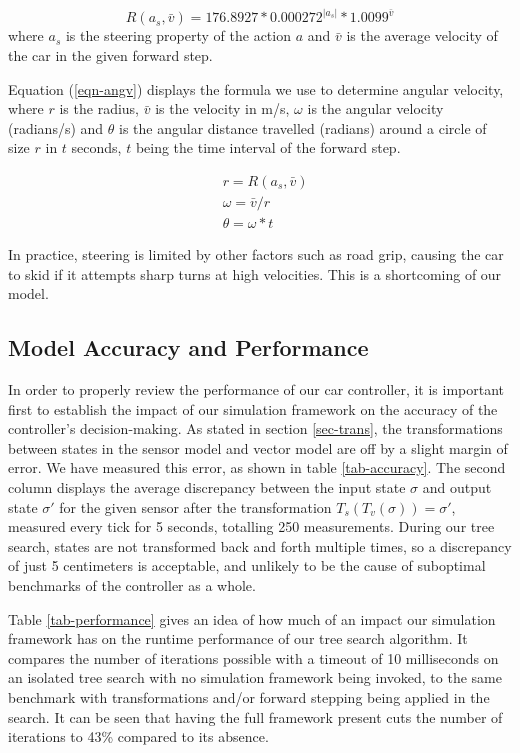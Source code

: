 \documentclass[conference]{IEEEtran}
\begin{document}
\begin{equation}
\label{eqn-steering}
R(a_s,\bar{v})=176.8927*0.000272^{|a_s|}*1.0099^{\bar{v}}
\end{equation}
where $a_s$ is the steering property of the action $a$ and $\bar{v}$ is the average velocity of the car in the given forward step.

Equation (\ref{eqn-angv}) displays the formula we use to determine angular velocity, where $r$ is the radius, $\bar{v}$ is the velocity in m/s, $\omega$ is the angular velocity (radians/s) and $\theta$ is the angular distance travelled (radians) around a circle of size $r$ in $t$ seconds, $t$ being the time interval of the forward step.

\begin{equation}
\label{eqn-angv}
\begin{alignedat}{1}
& r = R(a_s,\bar{v}) \\
& \omega = \bar{v} / r \\
& \theta = \omega * t
\end{alignedat}
\end{equation}

In practice, steering is limited by other factors such as road grip, causing the car to skid if it attempts sharp turns at high velocities. This is a shortcoming of our model.

\subsection{Model Accuracy and Performance}
\label{sec-accuracy}

In order to properly review the performance of our car controller, it is important first to establish the impact of our simulation framework on the accuracy of the controller's decision-making. As stated in section \ref{sec-trans}, the transformations between states in the sensor model and vector model are off by a slight margin of error. We have measured this error, as shown in table \ref{tab-accuracy}. The second column displays the average discrepancy between the input state $\sigma$ and output state $\sigma'$ for the given sensor after the transformation $T_s(T_v(\sigma))=\sigma'$, measured every tick for 5 seconds, totalling 250 measurements. During our tree search, states are not transformed back and forth multiple times, so a discrepancy of just 5 centimeters is acceptable, and unlikely to be the cause of suboptimal benchmarks of the controller as a whole.

Table \ref{tab-performance} gives an idea of how much of an impact our simulation framework has on the runtime performance of our tree search algorithm. It compares the number of iterations possible with a timeout of 10 milliseconds on an isolated tree search with no simulation framework being invoked, to the same benchmark with transformations and/or forward stepping being applied in the search. It can be seen that having the full framework present cuts the number of iterations to 43\% compared to its absence.
\end{document}
